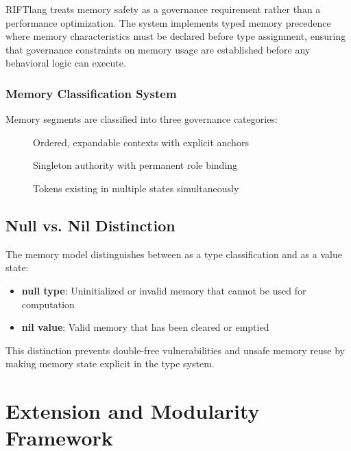 RIFTlang treats memory safety as a governance requirement rather than a performance optimization. The system implements typed memory precedence where memory characteristics must be declared before type assignment, ensuring that governance constraints on memory usage are established before any behavioral logic can execute.

\subsubsection{Memory Classification System}

Memory segments are classified into three governance categories:

\begin{description}
\item[] Ordered, expandable contexts with explicit anchors
\item[] Singleton authority with permanent role binding  
\item[] Tokens existing in multiple states simultaneously
\end{description}

\subsection{Null vs. Nil Distinction}

The memory model distinguishes between  as a type classification and  as a value state:

\begin{itemize}
\item \textbf{null type}: Uninitialized or invalid memory that cannot be used for computation
\item \textbf{nil value}: Valid memory that has been cleared or emptied
\end{itemize}

This distinction prevents double-free vulnerabilities and unsafe memory reuse by making memory state explicit in the type system.

\section{Extension and Modularity Framework}

